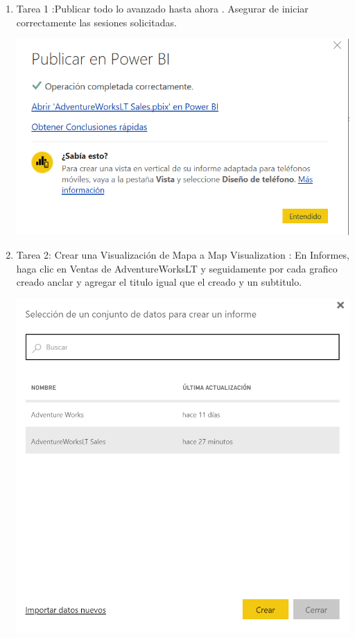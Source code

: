 \begin{itemize}
\begin{enumerate}
\item Tarea 1 :Publicar todo lo avanzado hasta ahora . Asegurar de iniciar correctamente las sesiones solicitadas.

\begin{center}
\includegraphics[scale=0.66]{./Imagenes/ejer3_publicar.png}
\end{center}

\item Tarea 2: Crear una Visualizaci\'on de Mapa a Map Visualization : En Informes, haga clic en Ventas de AdventureWorksLT y seguidamente por cada grafico creado anclar y agregar el titulo igual que el creado y un subtitulo.

\begin{center}
\includegraphics[scale=0.70]{./Imagenes/ejer3_clickBD.png}
\end{center}


\end{enumerate}
\end{itemize}
